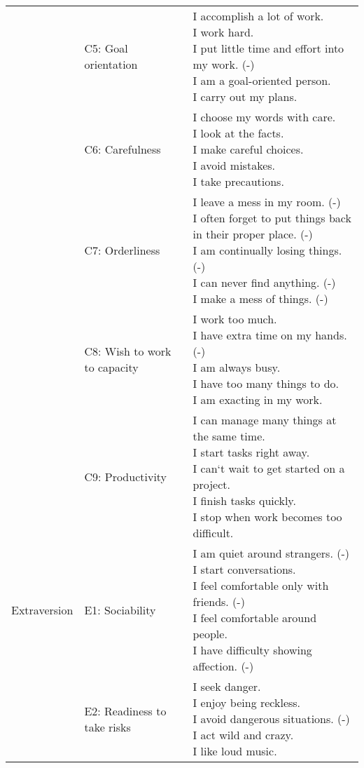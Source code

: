 \documentclass[]{article}
\begin{document}
\begin{longtable}[t]{lll}
\addlinespace
 & C5: Goal orientation & \makecell[l]{I accomplish a lot of work.\\I work hard.\\I put little time and effort into my work. (-)\\I am a goal-oriented person.\\I carry out my plans.}\\
\addlinespace
 & C6: Carefulness & \makecell[l]{I choose my words with care.\\I look at the facts.\\I make careful choices.\\I avoid mistakes.\\I take precautions.}\\
\addlinespace
 & C7: Orderliness & \makecell[l]{I leave a mess in my room. (-)\\I often forget to put things back in their proper place. (-)\\I am continually losing things. (-)\\I can never find anything. (-)\\I make a mess of things. (-)}\\
\addlinespace
 & C8: Wish to work to capacity & \makecell[l]{I work too much.\\I have extra time on my hands. (-)\\I am always busy.\\I have too many things to do.\\I am exacting in my work.}\\
\addlinespace
 & C9: Productivity & \makecell[l]{I can manage many things at the same time.\\I start tasks right away.\\I can`t wait to get started on a project.\\I finish tasks quickly.\\I stop when work becomes too difficult.}\\
\addlinespace
Extraversion & E1: Sociability & \makecell[l]{I am quiet around strangers. (-)\\I start conversations.\\I feel comfortable only with friends. (-)\\I feel comfortable around people.\\I have difficulty showing affection. (-)}\\
\addlinespace
 & E2: Readiness to take risks & \makecell[l]{I seek danger.\\I enjoy being reckless.\\I avoid dangerous situations. (-)\\I act wild and crazy.\\I like loud music.}\\

\end{longtable}
\end{document}
